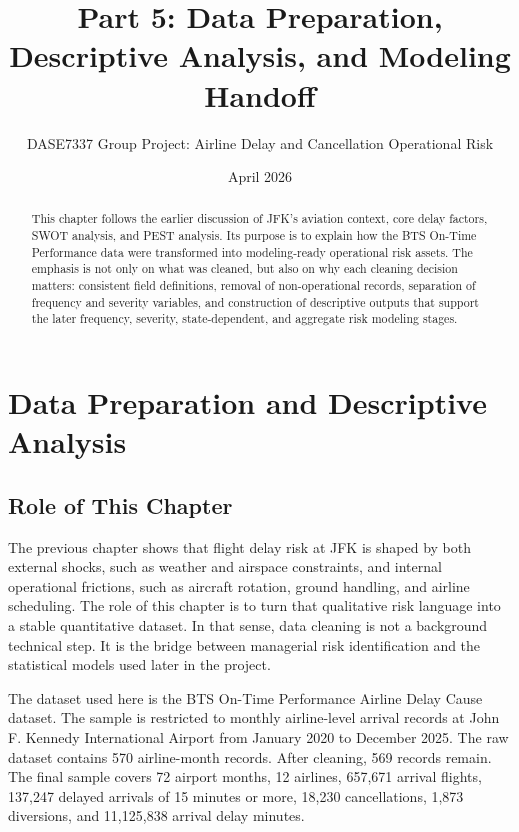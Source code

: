 \documentclass[11pt]{article}
\title{\textbf{Part 5: Data Preparation, Descriptive Analysis, and Modeling Handoff}}
\author{DASE7337 Group Project: Airline Delay and Cancellation Operational Risk}
\date{April 2026}
\begin{document}
\maketitle

\begin{abstract}
This chapter follows the earlier discussion of JFK's aviation context, core delay factors, SWOT analysis, and PEST analysis. Its purpose is to explain how the BTS On-Time Performance data were transformed into modeling-ready operational risk assets. The emphasis is not only on what was cleaned, but also on why each cleaning decision matters: consistent field definitions, removal of non-operational records, separation of frequency and severity variables, and construction of descriptive outputs that support the later frequency, severity, state-dependent, and aggregate risk modeling stages.
\end{abstract}

\setcounter{section}{4}
\section{Data Preparation and Descriptive Analysis}

\subsection{Role of This Chapter}
The previous chapter shows that flight delay risk at JFK is shaped by both external shocks, such as weather and airspace constraints, and internal operational frictions, such as aircraft rotation, ground handling, and airline scheduling. The role of this chapter is to turn that qualitative risk language into a stable quantitative dataset. In that sense, data cleaning is not a background technical step. It is the bridge between managerial risk identification and the statistical models used later in the project.

The dataset used here is the BTS On-Time Performance Airline Delay Cause dataset. The sample is restricted to monthly airline-level arrival records at John F. Kennedy International Airport from January 2020 to December 2025. The raw dataset contains 570 airline-month records. After cleaning, 569 records remain. The final sample covers 72 airport months, 12 airlines, 657,671 arrival flights, 137,247 delayed arrivals of 15 minutes or more, 18,230 cancellations, 1,873 diversions, and 11,125,838 arrival delay minutes.
\end{document}
